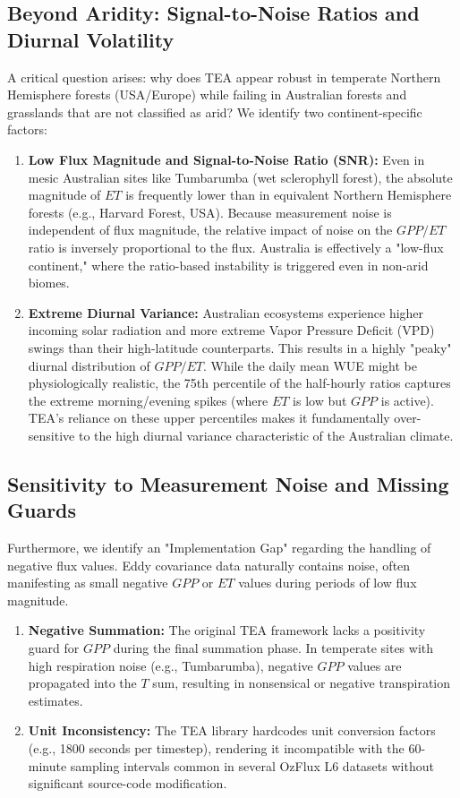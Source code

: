 \subsection{Beyond Aridity: Signal-to-Noise Ratios and Diurnal Volatility}

A critical question arises: why does TEA appear robust in temperate Northern Hemisphere forests (USA/Europe) while failing in Australian forests and grasslands that are not classified as arid? We identify two continent-specific factors:

\begin{enumerate}
    \item \textbf{Low Flux Magnitude and Signal-to-Noise Ratio (SNR):} Even in mesic Australian sites like Tumbarumba (wet sclerophyll forest), the absolute magnitude of $ET$ is frequently lower than in equivalent Northern Hemisphere forests (e.g., Harvard Forest, USA). Because measurement noise is independent of flux magnitude, the relative impact of noise on the $GPP/ET$ ratio is inversely proportional to the flux. Australia is effectively a "low-flux continent," where the ratio-based instability is triggered even in non-arid biomes.
    \item \textbf{Extreme Diurnal Variance:} Australian ecosystems experience higher incoming solar radiation and more extreme Vapor Pressure Deficit (VPD) swings than their high-latitude counterparts. This results in a highly "peaky" diurnal distribution of $GPP/ET$. While the daily mean WUE might be physiologically realistic, the 75th percentile of the half-hourly ratios captures the extreme morning/evening spikes (where $ET$ is low but $GPP$ is active). TEA's reliance on these upper percentiles makes it fundamentally over-sensitive to the high diurnal variance characteristic of the Australian climate.
\end{enumerate}

\subsection{Sensitivity to Measurement Noise and Missing Guards}

Furthermore, we identify an "Implementation Gap" regarding the handling of negative flux values. Eddy covariance data naturally contains noise, often manifesting as small negative $GPP$ or $ET$ values during periods of low flux magnitude. 
\begin{enumerate}
    \item \textbf{Negative Summation:} The original TEA framework lacks a positivity guard for $GPP$ during the final summation phase. In temperate sites with high respiration noise (e.g., Tumbarumba), negative $GPP$ values are propagated into the $T$ sum, resulting in nonsensical or negative transpiration estimates.
    \item \textbf{Unit Inconsistency:} The TEA library hardcodes unit conversion factors (e.g., 1800 seconds per timestep), rendering it incompatible with the 60-minute sampling intervals common in several OzFlux L6 datasets without significant source-code modification.
\end{enumerate}

